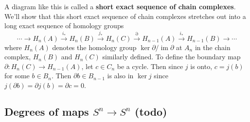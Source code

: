 \begin{figure}[H]
\centering
{}
\end{figure}
A diagram like this is called a \textbf{short exact sequence of chain complexes}. We'll show that this short exact sequence of chain complexes stretches out into a long exact sequence of homology groups \[
    \cdots \to H_n (A) \overset{i_*}{\longrightarrow} H_n (B) \overset{j_*}{\longrightarrow} H_n (C) \overset{\partial }{\longrightarrow} H_{n-1}(A)\overset{i_*}{\longrightarrow} H_{n-1}(B)\to \cdots 
\] where $H_n(A)$ denotes the homology group $\ker \partial  / \operatorname{im}\partial $ at $A_n $ in the chain complex, $H_n (B)$ and $H_n (C)$ similarly defined. To define the boundary map $\partial \colon H_n (C) \to H_{n-1}(A)$, let $c\in C_n $ be a cycle. Then since $j$ is onto, $c=j(b)$ for some $b\in B_n $. Then $\partial b\in B_{n-1}$ is also in $\ker j$ since $j(\partial b)=\partial j(b)=\partial c=0$. 

\subsection{Degrees of maps $S^n \to S^n $ (todo)}


